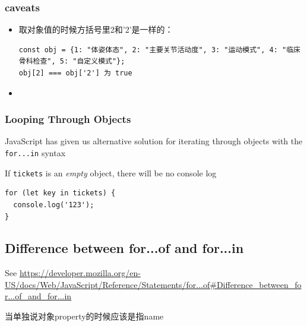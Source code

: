 \documentclass[a4paper, 12pt]{article}
\begin{document}
\subsubsection{caveats}
\begin{itemize}
\item 取对象值的时候方括号里2和'2'是一样的：
\begin{verbatim}
const obj = {1: "体姿体态", 2: "主要关节活动度", 3: "运动模式", 4: "临床骨科检查", 5: "自定义模式"};
obj[2] === obj['2'] 为 true
\end{verbatim}

\item 

\end{itemize}

\subsubsection{Looping Through Objects}
JavaScript has given us alternative solution for iterating through objects with the \verb|for...in| syntax

If \verb|tickets| is an \textit{empty} object, there will be no console log
\begin{verbatim}
for (let key in tickets) {
  console.log('123');
}
\end{verbatim}

\subsection{Difference between for...of and for...in}
See \url{https://developer.mozilla.org/en-US/docs/Web/JavaScript/Reference/Statements/for...of#Difference_between_for...of_and_for...in}

当单独说对象property的时候应该是指name
\end{document}
